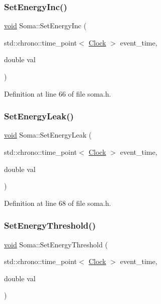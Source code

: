 \subsubsection{\texorpdfstring{Set\+Energy\+Inc()}{SetEnergyInc()}}
{\footnotesize\ttfamily \mbox{\hyperlink{glad_8h_a950fc91edb4504f62f1c577bf4727c29}{void}} Soma\+::\+Set\+Energy\+Inc (\begin{DoxyParamCaption}\item[{std\+::chrono\+::time\+\_\+point$<$ \mbox{\hyperlink{universe_8h_a0ef8d951d1ca5ab3cfaf7ab4c7a6fd80}{Clock}} $>$}]{event\+\_\+time,  }\item[{double}]{val }\end{DoxyParamCaption})\hspace{0.3cm}{\ttfamily [inline]}}



Definition at line 66 of file soma.\+h.

\mbox{\label{class_soma_abca59a00940ca2d9c005a84b6785c12f}} 
\subsubsection{\texorpdfstring{Set\+Energy\+Leak()}{SetEnergyLeak()}}
{\footnotesize\ttfamily \mbox{\hyperlink{glad_8h_a950fc91edb4504f62f1c577bf4727c29}{void}} Soma\+::\+Set\+Energy\+Leak (\begin{DoxyParamCaption}\item[{std\+::chrono\+::time\+\_\+point$<$ \mbox{\hyperlink{universe_8h_a0ef8d951d1ca5ab3cfaf7ab4c7a6fd80}{Clock}} $>$}]{event\+\_\+time,  }\item[{double}]{val }\end{DoxyParamCaption})\hspace{0.3cm}{\ttfamily [inline]}}



Definition at line 68 of file soma.\+h.

\mbox{\label{class_soma_ae2876b37909f37e8922ce364eb06491f}} 
\subsubsection{\texorpdfstring{Set\+Energy\+Threshold()}{SetEnergyThreshold()}}
{\footnotesize\ttfamily \mbox{\hyperlink{glad_8h_a950fc91edb4504f62f1c577bf4727c29}{void}} Soma\+::\+Set\+Energy\+Threshold (\begin{DoxyParamCaption}\item[{std\+::chrono\+::time\+\_\+point$<$ \mbox{\hyperlink{universe_8h_a0ef8d951d1ca5ab3cfaf7ab4c7a6fd80}{Clock}} $>$}]{event\+\_\+time,  }\item[{double}]{val }\end{DoxyParamCaption})\hspace{0.3cm}{\ttfamily [inline]}}



